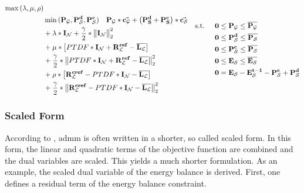 \begin{subequations}
	\begin{align}
		\max{(\lambda, \mu, \rho)} \label{eq:opt_admm_matrix}\\
		 & \min{(\vb{P_\mathcal{G}}, \vb{P_\mathcal{S}^d}, \vb{P_\mathcal{S}^c})} \quad \vb{P_\mathcal{G}} * \va{c_\mathcal{G}} + \left(\vb{P_S^d} + \vb{P_S^c}\right) * \va{c_\mathcal{S}} \nonumber \\
		 & + \vb{\lambda} * \vb{I_\mathcal{N}} + \frac{\gamma}{2} * \big\|\vb{I_\mathcal{N}}\big\|_2^2 \nonumber \\
		 & + \vb{\mu} * \left[ PTDF * \vb{I_\mathcal{N}} + \vb{R_\mathcal{L}^{ref}} - \vb{\overline{L_\mathcal{L}}} \right] \nonumber \\
		 & + \frac{\gamma}{2} * \big\| PTDF * \vb{I_\mathcal{N}} + \vb{R_\mathcal{L}^{ref}} - \vb{\overline{L_\mathcal{L}}} \big\|_2^2 \nonumber \\
		 & + \vb{\rho} * \left[ \vb{R_\mathcal{L}^{cref}} - PTDF * \vb{I_\mathcal{N}} - \vb{\overline{L_\mathcal{L}}} \right] \nonumber \\
		 & + \frac{\gamma}{2} * \big\| \vb{R_\mathcal{L}^{cref}} - PTDF * \vb{I_\mathcal{N}} - \vb{\overline{L_\mathcal{L}}} \big\|_2^2 \nonumber
	\end{align}
		\begin{align}
		 \text{s.t. } \quad & \vb{0} \leq \vb{P_\mathcal{G}} \leq \vb{\overline{P_\mathcal{G}}} \\
		 & \vb{0} \leq \vb{P_\mathcal{S}^d} \leq \vb{\overline{P_\mathcal{S}}} \\
		 & \vb{0} \leq \vb{P_\mathcal{S}^c} \leq \vb{\overline{P_\mathcal{S}}} \\
		 & \vb{0} \leq \vb{E_\mathcal{S}} \leq \vb{\overline{E_\mathcal{S}}}\\
		 & \vb{0} = \vb{E_\mathcal{S}} - \vb{E_\mathcal{S}^{t-1}} - \vb{P_\mathcal{S}^c} + \vb{P_\mathcal{S}^d}
	\end{align}
\end{subequations}

\subsubsection{Scaled Form}

According to \citet{Boyd-2010-DistributedOptimizationStatistical}, \gls{admm} is often written in a shorter, so called scaled form. In this form, the linear and quadratic terms of the objective function are combined and the dual variables are scaled. This yields a much shorter formulation. As an example, the scaled dual variable of the energy balance is derived. First, one defines a residual term of the energy balance constraint.

